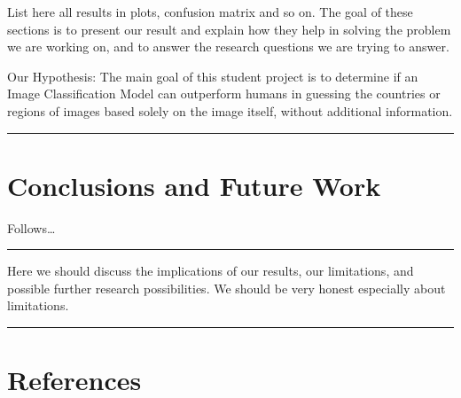 \documentclass{article}
\begin{document}
List here all results in plots, confusion matrix and so on. The goal of
these sections is to present our result and explain how they help in
solving the problem we are working on, and to answer the research
questions we are trying to answer.

Our Hypothesis: The main goal of this student project is to determine if
an Image Classification Model can outperform humans in guessing the
countries or regions of images based solely on the image itself, without
additional information.

\begin{center}\rule{0.5\linewidth}{0.5pt}\end{center}

\section{Conclusions and Future Work}\label{conclusions-and-future-work}

Follows\ldots{}

\begin{center}\rule{0.5\linewidth}{0.5pt}\end{center}

Here we should discuss the implications of our results, our limitations,
and possible further research possibilities. We should be very honest
especially about limitations.

\begin{center}\rule{0.5\linewidth}{0.5pt}\end{center}

\section{References}\label{references}
\end{document}
